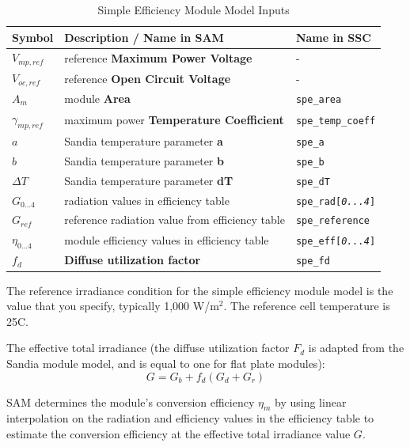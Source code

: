 \documentclass[12pt,letterpaper]{article}
\begin{document}
\begin{table}
\begin{center}
\caption{Simple Efficiency Module Model Inputs}
\begin{tabular}{lll}
\midrule
Symbol & Description / \textbf{Name in SAM} & Name in SSC \\
\midrule
$V_{mp,ref}$ & reference \textbf{Maximum Power Voltage} & - \\
$V_{oc,ref}$ & reference \textbf{Open Circuit Voltage} & - \\
$A_m$ & module \textbf{Area} & \texttt{spe\_area} \\
$\gamma_{mp,ref}$ & maximum power \textbf{Temperature Coefficient} & \texttt{spe\_temp\_coeff} \\
$a$ & Sandia temperature parameter \textbf{a} & \texttt{spe\_a} \\
$b$ & Sandia temperature parameter \textbf{b} & \texttt{spe\_b} \\
$\Delta T$ & Sandia temperature parameter \textbf{dT} & \texttt{spe\_dT} \\
$G_{0...4}$ & radiation values in efficiency table & \texttt{spe\_rad[\textit{0...4}]} \\
$G_{ref}$ & reference radiation value from efficiency table & \texttt{spe\_reference} \\
$\eta_{0...4}$ & module efficiency values in efficiency table & \texttt{spe\_eff[\textit{0...4}]} \\
$f_d$ & \textbf{Diffuse utilization factor} & \texttt{spe\_fd} \\
\hline
\end{tabular}
\label{tab-spemodulevars}
\end{center}
\end{table}

The reference irradiance condition for the simple efficiency module model is the value that you specify, typically 1,000 W/m$^2$. The reference cell temperature is 25\degree C. 

The effective total irradiance (the diffuse utilization factor $F_d$ is adapted from the Sandia module model, and is equal to one for flat plate modules):
\begin{equation}
G = G_b + f_d(G_d+G_r)
\end{equation}

SAM determines the module's conversion efficiency $\eta_m$ by using linear interpolation on the radiation and efficiency values in the efficiency table to estimate the conversion efficiency at the effective total irradiance value $G$.
\end{document}
